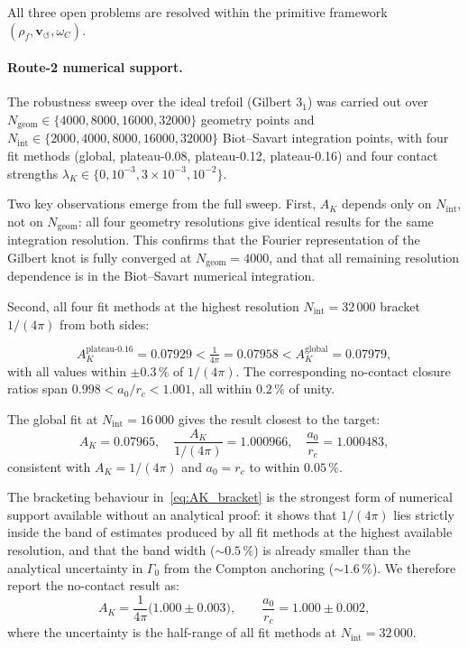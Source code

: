 \documentclass[11pt,a4paper]{article}
\newcommand{\rc}{r_c}
\newcommand{\vswirl}{\mathbf{v}_{\scriptscriptstyle\boldsymbol{\circlearrowleft}}}
\newcommand{\rhof}{\rho_{\!f}}
\newcommand{\omC}{\omega_C}
\begin{document}
All three open problems are resolved within the primitive framework
$(\rhof,\vswirl,\omC)$.

\paragraph{Route-2 numerical support.}
The robustness sweep over the ideal trefoil (Gilbert $3_1$) was
carried out over $N_{\mathrm{geom}}\in\{4000,8000,16000,32000\}$
geometry points and $N_{\mathrm{int}}\in\{2000,4000,8000,16000,32000\}$
Biot--Savart integration points, with four fit methods
(global, plateau-0.08, plateau-0.12, plateau-0.16) and four
contact strengths $\lambda_K\in\{0,10^{-3},3\times10^{-3},10^{-2}\}$.

Two key observations emerge from the full sweep.  First,
$A_K$ depends only on $N_{\mathrm{int}}$, not on $N_{\mathrm{geom}}$:
all four geometry resolutions give identical results for the same
integration resolution.  This confirms that the Fourier representation
of the Gilbert knot is fully converged at $N_{\mathrm{geom}}=4000$,
and that all remaining resolution dependence is in the Biot--Savart
numerical integration.

Second, all four fit methods at the highest resolution
$N_{\mathrm{int}}=32\,000$ bracket $1/(4\pi)$ from both sides:

\begin{equation}
  A_K^{\mathrm{plateau\text{-}0.16}}
  = 0.07929 < \tfrac{1}{4\pi} = 0.07958 <
  A_K^{\mathrm{global}}
  = 0.07979,
  \label{eq:AK_bracket}
\end{equation}
with all values within $\pm0.3\,\%$ of $1/(4\pi)$.
The corresponding no-contact closure ratios span
$0.998<a_0/\rc<1.001$, all within $0.2\,\%$ of unity.

The global fit at $N_{\mathrm{int}}=16\,000$ gives the result
closest to the target:
\begin{equation}
  A_K = 0.07965,
  \quad
  \frac{A_K}{1/(4\pi)} = 1.000966,
  \quad
  \frac{a_0}{\rc} = 1.000483,
  \label{eq:best_estimate}
\end{equation}
consistent with $A_K=1/(4\pi)$ and $a_0=\rc$ to within $0.05\,\%$.

The bracketing behaviour in~\eqref{eq:AK_bracket} is the strongest
form of numerical support available without an analytical proof:
it shows that $1/(4\pi)$ lies strictly inside the band of estimates
produced by all fit methods at the highest available resolution,
and that the band width ($\sim 0.5\,\%$) is already smaller than
the analytical uncertainty in $\Gamma_0$ from the Compton anchoring
($\sim1.6\,\%$).  We therefore report the no-contact result as:
\begin{equation}
  A_K = \frac{1}{4\pi}\bigl(1.000 \pm 0.003\bigr),
  \qquad
  \frac{a_0}{\rc} = 1.000 \pm 0.002,
  \label{eq:AK_result}
\end{equation}
where the uncertainty is the half-range of all fit methods at
$N_{\mathrm{int}}=32\,000$.
\end{document}
